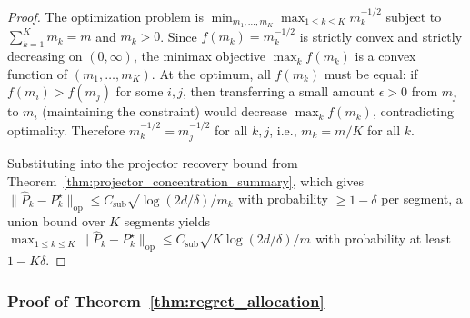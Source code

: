 \documentclass{article}
\newcommand{\op}{\mathrm{op}}
\begin{document}
\begin{proof}
The optimization problem is $\min_{m_1, \ldots, m_K} \max_{1 \le k \le K} m_k^{-1/2}$ subject to $\sum_{k=1}^K m_k = m$ and $m_k > 0$.  Since $f(m_k) = m_k^{-1/2}$ is strictly convex and strictly decreasing on $(0, \infty)$, the minimax objective $\max_k f(m_k)$ is a convex function of $(m_1, \ldots, m_K)$.  At the optimum, all $f(m_k)$ must be equal: if $f(m_i) > f(m_j)$ for some $i, j$, then transferring a small amount $\epsilon > 0$ from $m_j$ to $m_i$ (maintaining the constraint) would decrease $\max_k f(m_k)$, contradicting optimality.  Therefore $m_k^{-1/2} = m_j^{-1/2}$ for all $k, j$, i.e., $m_k = m/K$ for all $k$.

Substituting into the projector recovery bound from Theorem~\ref{thm:projector_concentration_summary}, which gives $\|\widehat{P}_k - P_k^\star\|_{\op} \le C_{\mathrm{sub}} \sqrt{\log(2d/\delta)/m_k}$ with probability $\ge 1 - \delta$ per segment, a union bound over $K$ segments yields
$\max_{1 \le k \le K} \|\widehat{P}_k - P_k^\star\|_{\op} \le C_{\mathrm{sub}}\sqrt{K\log(2d/\delta) / m}$
with probability at least $1 - K\delta$.
\end{proof}

\subsubsection{Proof of Theorem~\ref{thm:regret_allocation}}
\label{proof:regret_allocation}
\end{document}
